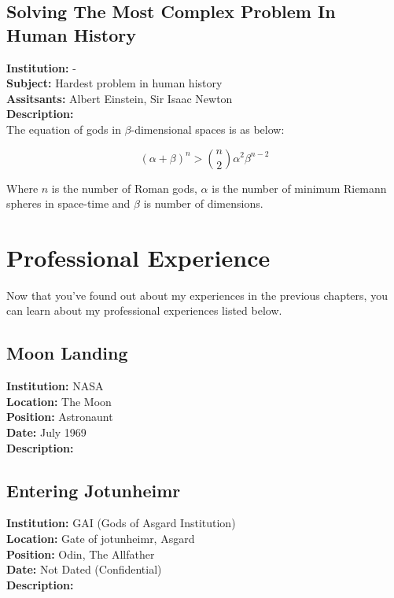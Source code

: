 \documentclass[12pt,a4paper]{report}
\begin{document}
\section{Solving The Most Complex Problem In Human History}
{\textbf {Institution:}} - \\
{\textbf {Subject:}} Hardest problem in human history\\
{\textbf {Assitsants:}} Albert Einstein, Sir Isaac Newton \\
{\textbf {Description:}} \\
The equation of gods in $\beta$-dimensional spaces is as below:

\begin{equation}
(\alpha + \beta) ^ n > {n \choose 2} \alpha^2 \beta ^ {n - 2}
\end{equation}

Where $n$ is the number of Roman gods, $\alpha$ is the number of minimum Riemann spheres in space-time and $\beta$ is number of dimensions.
\lipsum[3]


\chapter{Professional Experience}
Now that you've found out about my experiences in the previous chapters, you can learn about my professional experiences listed below.

\section{Moon Landing}
{\textbf {Institution:}} NASA \\
{\textbf {Location:}} The Moon\\
{\textbf {Position:}} Astronaunt \\
{\textbf {Date:}} July 1969\\
{\textbf {Description:}} \\
\lipsum[4]

\section{Entering Jotunheimr}
{\textbf {Institution:}} GAI (Gods of Asgard Institution) \\
{\textbf {Location:}} Gate of jotunheimr, Asgard\\
{\textbf {Position:}} Odin, The Allfather \\
{\textbf {Date:}} Not Dated (Confidential)\\
{\textbf {Description:}} \\
\lipsum[5]
\end{document}
